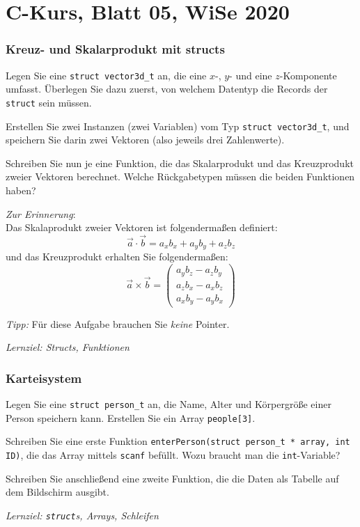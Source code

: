 \documentclass[
	ngerman,
	fontsize=10pt,
	parskip=half,
	titlepage=true,
	DIV=12
]{scrartcl}
\begin{document}
\part*{C-Kurs, Blatt 05, WiSe 2020}

\section{Kreuz- und Skalarprodukt mit structs}
Legen Sie eine \texttt{struct vector3d\_t} an, die eine $x$-, $y$- und eine $z$-Komponente umfasst. Überlegen Sie dazu zuerst, von welchem Datentyp die Records der \texttt{struct} sein müssen.

Erstellen Sie zwei Instanzen (zwei Variablen) vom Typ \texttt{struct vector3d\_t}, und speichern Sie darin zwei Vektoren (also jeweils drei Zahlenwerte).

Schreiben Sie nun je eine Funktion, die das Skalarprodukt und das Kreuzprodukt zweier Vektoren berechnet.
Welche Rückgabetypen müssen die beiden Funktionen haben?

\emph{Zur Erinnerung}:\\
Das Skalaprodukt zweier Vektoren ist folgendermaßen definiert:
\[ \vec{a} \cdot \vec{b} = a_x b_x + a_y b_y + a_z b_z \]
und das Kreuzprodukt erhalten Sie folgendermaßen:
\[
	\vec{a} \times \vec{b} =
	\begin{pmatrix}
		a_y b_z - a_z b_y\\
		a_z b_x - a_x b_z\\
		a_x b_y - a_y b_x
	\end{pmatrix}
\]

\emph{Tipp:} Für diese Aufgabe brauchen Sie \emph{keine} Pointer.

\emph{Lernziel: Structs, Funktionen}


\section{Karteisystem}
Legen Sie eine \texttt{struct person\_t} an, die Name, Alter und Körpergröße einer Person speichern kann. Erstellen Sie ein Array \texttt{people[3]}.

Schreiben Sie eine erste Funktion \texttt{enterPerson(struct person\_t * array, int ID)}, die das Array mittels \texttt{scanf} befüllt. Wozu braucht man die \texttt{int}-Variable?

Schreiben Sie anschließend eine zweite Funktion, die die Daten als Tabelle auf dem Bildschirm ausgibt.

\emph{Lernziel: \texttt{struct}s, Arrays, Schleifen}
\end{document}
